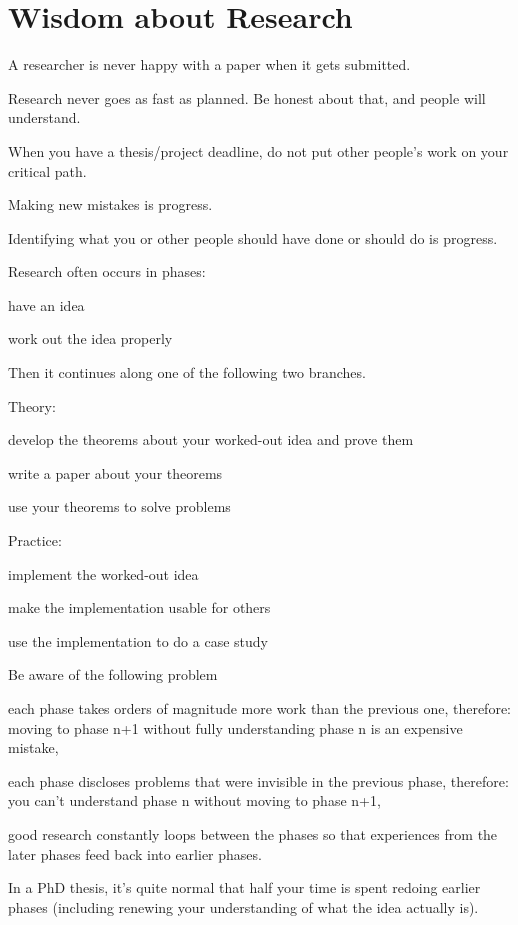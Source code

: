 \documentclass[12pt]{article}
\begin{document}
\section{Wisdom about Research}

A researcher is never happy with a paper when it gets submitted.
\medskip

Research never goes as fast as planned. Be honest about that, and people will understand.
\medskip

When you have a thesis/project deadline, do not put other people's work on your critical path.
\medskip

Making new mistakes is progress.
\medskip

Identifying what you or other people should have done or should do is progress.
\medskip

Research often occurs in phases:
\begin{compactenum}
\item have an idea
\item work out the idea properly
\end{compactenum}

Then it continues along one of the following two branches.

Theory:
\begin{compactenum}
\item develop the theorems about your worked-out idea and prove them
\item write a paper about your theorems
\item use your theorems to solve problems
\end{compactenum}

Practice:
\begin{compactenum}
\item implement the worked-out idea
\item make the implementation usable for others
\item use the implementation to do a case study
\end{compactenum}
\medskip

Be aware of the following problem
\begin{compactitem}
\item each phase takes orders of magnitude more work than the previous one,
  therefore: moving to phase n+1 without fully understanding phase n is an expensive mistake,
\item each phase discloses problems that were invisible in the previous phase,
  therefore: you can't understand phase n without moving to phase n+1,
\item good research constantly loops between the phases so that experiences from the later phases feed back into earlier phases.
\end{compactitem}
In a PhD thesis, it's quite normal that half your time is spent redoing earlier phases (including renewing your understanding of what the idea actually is).
\medskip
\end{document}
